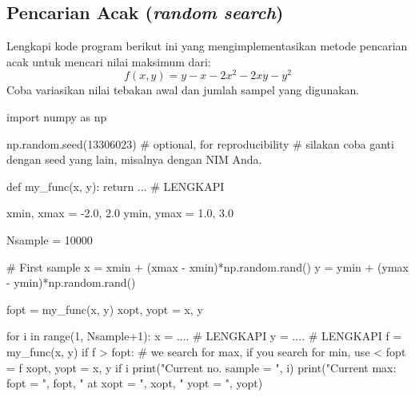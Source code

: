 \subsection{Pencarian Acak (\textit{random search})}

\begin{soal}
Lengkapi kode program berikut ini yang mengimplementasikan metode
pencarian acak untuk mencari nilai maksimum dari:
\begin{equation*}
f(x,y) = y - x - 2x^2 - 2xy - y^2
\end{equation*}
Coba variasikan nilai tebakan awal dan jumlah sampel yang digunakan.
\end{soal}

\begin{pythoncode}
import numpy as np

np.random.seed(13306023) # optional, for reproducibility
# silakan coba ganti dengan seed yang lain, misalnya dengan NIM Anda.

def my_func(x, y):
    return ... # LENGKAPI

xmin, xmax = -2.0, 2.0
ymin, ymax = 1.0, 3.0

Nsample = 10000

# First sample
x = xmin + (xmax - xmin)*np.random.rand()
y = ymin + (ymax - ymin)*np.random.rand()

fopt = my_func(x, y)
xopt, yopt = x, y

for i in range(1, Nsample+1):
    x = .... # LENGKAPI
    y = .... # LENGKAPI
    f = my_func(x, y)
    if f > fopt: # we search for max, if you search for min, use <
        fopt = f
        xopt, yopt = x, y
    if i %
        print("Current no. sample = ", i)
        print("Current max: fopt = ", fopt, " at xopt = ", xopt, " yopt = ", yopt)
\end{pythoncode}